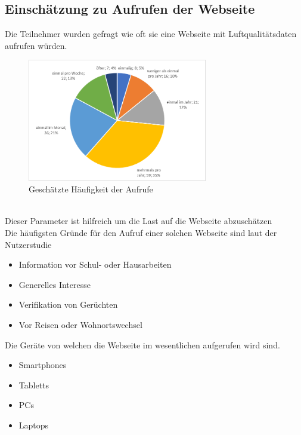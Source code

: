 \subsection{Einschätzung zu Aufrufen der Webseite}
Die Teilnehmer wurden gefragt wie oft sie eine Webseite mit Luftqualitätsdaten aufrufen würden.
\\
\begin{figure}[h]
    \centering
    \includegraphics[width=0.7\textwidth]{media/diagram/aufrufe.png}
    \caption{Geschätzte Häufigkeit der Aufrufe}
\end{figure}
\\
Dieser Parameter ist hilfreich um die Last auf die Webseite abzuschätzen
\\
Die häufigsten Gründe für den Aufruf einer solchen Webseite sind laut der Nutzerstudie
\begin{itemize} [noitemsep]
    \item Information vor Schul- oder Hausarbeiten
    \item Generelles Interesse
    \item Verifikation von Gerüchten
    \item Vor Reisen oder Wohnortswechsel
\end{itemize}
Die Geräte von welchen die Webseite im wesentlichen aufgerufen wird sind.
\begin{itemize} [noitemsep]
    \item Smartphones
    \item Tabletts
    \item PCs
    \item Laptops
\end{itemize}

